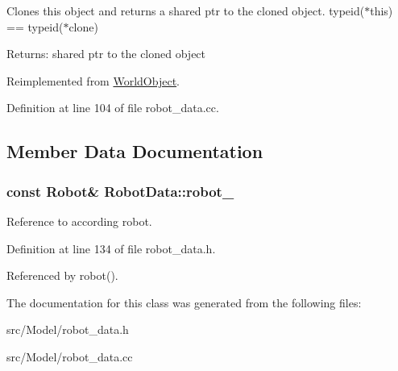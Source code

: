 Clones this object and returns a shared ptr to the cloned object. typeid($\ast$this) == typeid($\ast$clone) \begin{Desc}
\item[Returns:]shared ptr to the cloned object \end{Desc}


Reimplemented from \hyperlink{class_world_object_dba468299ce77ce5781e60081bf44b14}{WorldObject}.

Definition at line 104 of file robot\_\-data.cc.

\subsection{Member Data Documentation}
\hypertarget{class_robot_data_76bc912be93d4367f36234756b3bab7d}{
\subsubsection[robot\_\-]{\setlength{\rightskip}{0pt plus 5cm}const Robot\& {\bf RobotData::robot\_\-}}}
\label{class_robot_data_76bc912be93d4367f36234756b3bab7d}


Reference to according robot. 

Definition at line 134 of file robot\_\-data.h.

Referenced by robot().

The documentation for this class was generated from the following files:\begin{CompactItemize}
\item 
src/Model/robot\_\-data.h\item 
src/Model/robot\_\-data.cc\end{CompactItemize}
